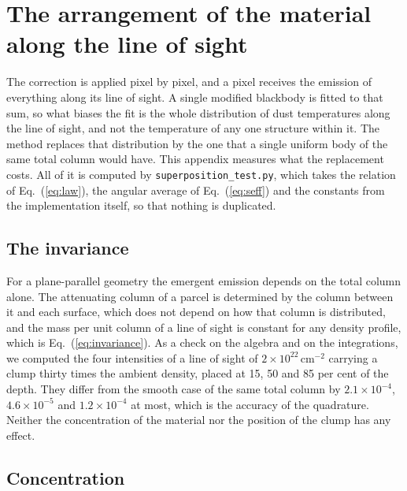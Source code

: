 
\section{The arrangement of the material along the line of sight}
\label{app:arrange}

The correction is applied pixel by pixel, and a pixel receives the emission of everything along its line of sight. A single
modified blackbody is fitted to that sum, so what biases the fit is the whole distribution of dust temperatures along the line of
sight, and not the temperature of any one structure within it. The method replaces that distribution by the one that a single
uniform body of the same total column would have. This appendix measures what the replacement costs. All of it is computed by
\texttt{superposition\_test.py}, which takes the relation of Eq.~(\ref{eq:law}), the angular average of Eq.~(\ref{eq:seff}) and
the constants from the implementation itself, so that nothing is duplicated.

\subsection{The invariance}

For a plane-parallel geometry the emergent emission depends on the total column alone. The attenuating column of a parcel is
determined by the column between it and each surface, which does not depend on how that column is distributed, and the mass per
unit column of a line of sight is constant for any density profile, which is Eq.~(\ref{eq:invariance}). As a check on the algebra
and on the integrations, we computed the four intensities of a line of sight of $2{\times}10^{22}$\,cm$^{-2}$ carrying a clump
thirty times the ambient density, placed at 15, 50 and 85 per cent of the depth. They differ from the smooth case of the same
total column by $2.1{\times}10^{-4}$, $4.6{\times}10^{-5}$ and $1.2{\times}10^{-4}$ at most, which is the accuracy of the
quadrature. Neither the concentration of the material nor the position of the clump has any effect.

\subsection{Concentration}

